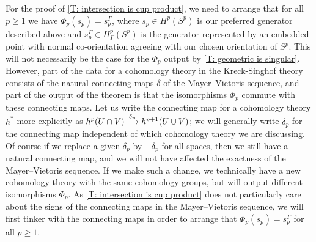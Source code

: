 	For the proof of \cref{T: intersection is cup product}, we need to arrange that for all $p\geq 1$ we have $\Phi_p(s_p) = s_p^\Gamma$, where
	$s_p \in H^p(S^p)$ is our preferred generator described above and $s_p^\Gamma \in H^p_\Gamma(S^p)$ is the generator represented by an embedded point with normal co-orientation agreeing with our chosen orientation of $S^p$.
	This will not necessarily be the case for the $\Phi_p$ output by \cref{T: geometric is singular}.
	However, part of the data for a cohomology theory in the Kreck-Singhof theory consists of the natural connecting maps $\delta$ of the Mayer--Vietoris sequence, and part of the output of the theorem is that the isomorphisms $\Phi_p$ commute with these connecting maps.
	Let us write the connecting map for a cohomology theory $h^*$ more explicitly as $h^p(U \cap V) \xrightarrow{\delta_p}h^{p+1}(U \cup V)$; we will generally write $\delta_p$ for the connecting map independent of which cohomology theory we are discussing.
	Of course if we replace a given $\delta_p$ by $-\delta_p$ for all spaces, then we still have a natural connecting map, and we will not have affected the exactness of the Mayer--Vietoris sequence.
	If we make such a change, we technically have a new cohomology theory with the same cohomology groups, but \cite[Theorem 10]{Krec10b} will output different isomorphisms $\Phi_p$.
	As \cref{T: intersection is cup product} does not particularly care about the signs of the connecting maps in the Mayer--Vietoris sequence, we will first tinker with the connecting maps in order to arrange that $\Phi_p(s_p) = s_p^\Gamma$ for all $p\geq 1$.
\begin{comment}
	Then we will be able to show the resulting $\Phi_p$ satisfy \cref{T: intersection is cup product}.
\end{comment}

